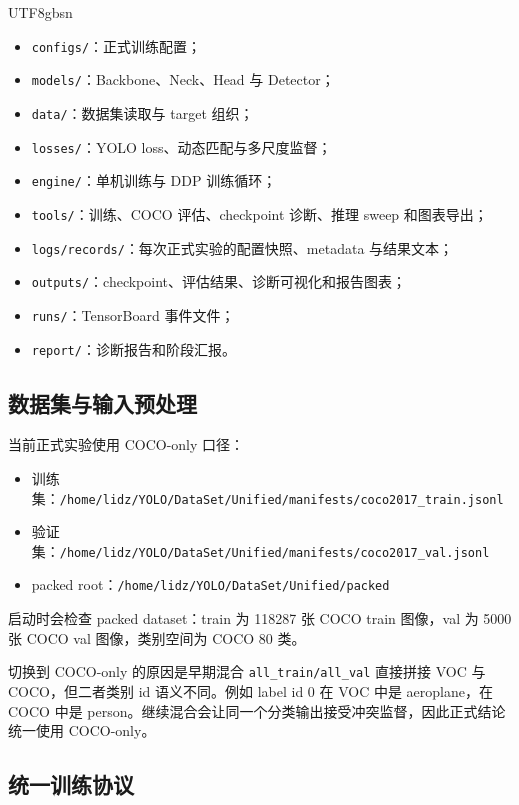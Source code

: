 \documentclass[11pt,a4paper]{article}
\begin{document}
\begin{CJK*}{UTF8}{gbsn}
\begin{itemize}
  \item \texttt{configs/}：正式训练配置；
  \item \texttt{models/}：Backbone、Neck、Head 与 Detector；
  \item \texttt{data/}：数据集读取与 target 组织；
  \item \texttt{losses/}：YOLO loss、动态匹配与多尺度监督；
  \item \texttt{engine/}：单机训练与 DDP 训练循环；
  \item \texttt{tools/}：训练、COCO 评估、checkpoint 诊断、推理 sweep 和图表导出；
  \item \texttt{logs/records/}：每次正式实验的配置快照、metadata 与结果文本；
  \item \texttt{outputs/}：checkpoint、评估结果、诊断可视化和报告图表；
  \item \texttt{runs/}：TensorBoard 事件文件；
  \item \texttt{report/}：诊断报告和阶段汇报。
\end{itemize}

\subsection{数据集与输入预处理}

当前正式实验使用 COCO-only 口径：

\begin{itemize}
  \item 训练集：\texttt{/home/lidz/YOLO/DataSet/Unified/manifests/coco2017\_train.jsonl}
  \item 验证集：\texttt{/home/lidz/YOLO/DataSet/Unified/manifests/coco2017\_val.jsonl}
  \item packed root：\texttt{/home/lidz/YOLO/DataSet/Unified/packed}
\end{itemize}

启动时会检查 packed dataset：train 为 118287 张 COCO train 图像，val 为 5000 张 COCO val 图像，类别空间为 COCO 80 类。

切换到 COCO-only 的原因是早期混合 \texttt{all\_train/all\_val} 直接拼接 VOC 与 COCO，但二者类别 id 语义不同。例如 label id 0 在 VOC 中是 aeroplane，在 COCO 中是 person。继续混合会让同一个分类输出接受冲突监督，因此正式结论统一使用 COCO-only。

\subsection{统一训练协议}


\end{CJK*}
\end{document}
